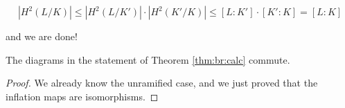 \documentclass[class=article, crop=false]{standalone}
\begin{document}
$$|H^2(L/K)|\leq |H^2(L/K')|\cdot|H^2(K'/K)|\leq [L:K']\cdot[K':K]=[L:K]$$

and we are done!

\begin{lemma} \label{lem:br:diags}
	The diagrams in the statement of Theorem \ref{thm:br:calc}
	commute.
\end{lemma}

\begin{proof}
	We already know the unramified case, and we just proved that 
	the inflation maps are isomorphisms.
\end{proof}
\end{document}
